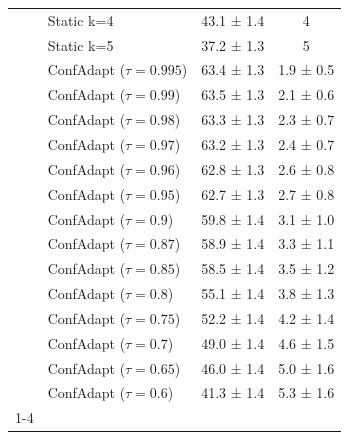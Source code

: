\documentclass{article}
\theoremstyle{plain}
\theoremstyle{definition}
\theoremstyle{remark}
\begin{document}
\begin{table}[h!]
\begin{tabular}{llcc}
 & Static k=4 & 43.1 ± 1.4 & 4 \\
 & Static k=5 & 37.2 ± 1.3 & 5 \\
 & ConfAdapt ($\tau=0.995$) & 63.4 ± 1.3 & 1.9 ± 0.5 \\
 & ConfAdapt ($\tau=0.99$) & 63.5 ± 1.3 & 2.1 ± 0.6 \\
 & ConfAdapt ($\tau=0.98$) & 63.3 ± 1.3 & 2.3 ± 0.7 \\
 & ConfAdapt ($\tau=0.97$) & 63.2 ± 1.3 & 2.4 ± 0.7 \\
 & ConfAdapt ($\tau=0.96$) & 62.8 ± 1.3 & 2.6 ± 0.8 \\
 & ConfAdapt ($\tau=0.95$) & 62.7 ± 1.3 & 2.7 ± 0.8 \\
 & ConfAdapt ($\tau=0.9$) & 59.8 ± 1.4 & 3.1 ± 1.0 \\
 & ConfAdapt ($\tau=0.87$) & 58.9 ± 1.4 & 3.3 ± 1.1 \\
 & ConfAdapt ($\tau=0.85$) & 58.5 ± 1.4 & 3.5 ± 1.2 \\
 & ConfAdapt ($\tau=0.8$) & 55.1 ± 1.4 & 3.8 ± 1.3 \\
 & ConfAdapt ($\tau=0.75$) & 52.2 ± 1.4 & 4.2 ± 1.4 \\
 & ConfAdapt ($\tau=0.7$) & 49.0 ± 1.4 & 4.6 ± 1.5 \\
 & ConfAdapt ($\tau=0.65$) & 46.0 ± 1.4 & 5.0 ± 1.6 \\
 & ConfAdapt ($\tau=0.6$) & 41.3 ± 1.4 & 5.3 ± 1.6 \\
\cline{1-4}
\bottomrule
\end{tabular}
\end{table}
\end{document}
